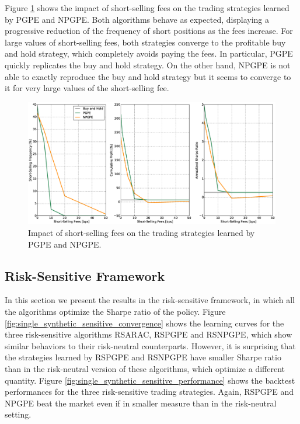Figure \ref{fig:impact_short_selling_fees} shows the impact of short-selling fees on the trading strategies learned by PGPE and NPGPE. Both algorithms behave as expected, displaying a progressive reduction of the frequency of short positions as the fees increase. For large values of short-selling fees, both strategies converge to the profitable buy and hold strategy, which completely avoids paying the fees. In particular, PGPE quickly replicates the buy and hold strategy. On the other hand, NPGPE is not able to exactly reproduce the buy and hold strategy but it seems to converge to it for very large values of the short-selling fee. 
\begin{figure}[t!]
	\centering
	\includegraphics[width=1.0\textwidth]{Images/6_3_impact_short_selling_fees}
	\caption[Impact of short-selling fees]{Impact of short-selling fees on the trading strategies learned by PGPE and NPGPE.}
	\label{fig:impact_short_selling_fees}
\end{figure}

\subsection{Risk-Sensitive Framework}
In this section we present the results in the risk-sensitive framework, in which all the algorithms optimize the Sharpe ratio of the policy. Figure \ref{fig:single_synthetic_sensitive_convergence} shows the learning curves for the three risk-sensitive algorithms RSARAC, RSPGPE and RSNPGPE, which show similar behaviors to their risk-neutral counterparts. However, it is surprising that the strategies learned by RSPGPE and RSNPGPE have smaller Sharpe ratio than in the risk-neutral version of these algorithms, which optimize a different quantity. Figure \ref{fig:single_synthetic_sensitive_performance} shows the backtest performances for the three risk-sensitive trading strategies. Again, RSPGPE and NPGPE beat the market even if in smaller measure than in the risk-neutral setting. 

